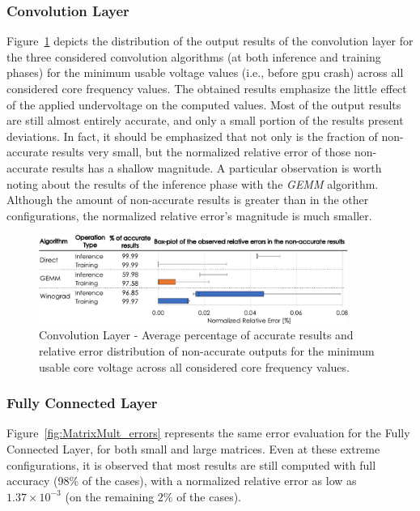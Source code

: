 \subsubsection{Convolution Layer}

Figure~\ref{fig:Convolution_errors} depicts the distribution of the output results of the convolution layer for the three considered convolution algorithms (at both inference and training phases) for the minimum usable voltage values (i.e., before \acrshort{gpu} crash) across all considered core frequency values. The obtained results emphasize the little effect of the applied undervoltage on the computed values. Most of the output results are still almost entirely accurate, and only a small portion of the results present deviations. In fact, it should be emphasized that not only is the fraction of non-accurate results very small, but the normalized relative error of those non-accurate results has a shallow magnitude. A particular observation is worth noting about the results of the inference phase with the \textit{GEMM} algorithm. Although the amount of non-accurate results is greater than in the other configurations, the normalized relative error's magnitude is much smaller.

\begin{figure}[htbp]
    \centering
        \includegraphics[width=0.9\textwidth]{Figures/Application To Deep Learning/Convolution_Error_Distribution.pdf}
        \caption{Convolution Layer - Average percentage of accurate results and relative error distribution of non-accurate outputs for the minimum usable core voltage across all considered core frequency values.}
    \label{fig:Convolution_errors}
\end{figure}



\subsubsection{Fully Connected Layer}

Figure~\ref{fig:MatrixMult_errors} represents the same error evaluation for the Fully Connected Layer, for both small and large matrices. Even at these extreme configurations, it is observed that most results are still computed with full accuracy (98\% of the cases), with a normalized relative error as low as $1.37\times10^{-3}$ (on the remaining $2$\% of the cases).

